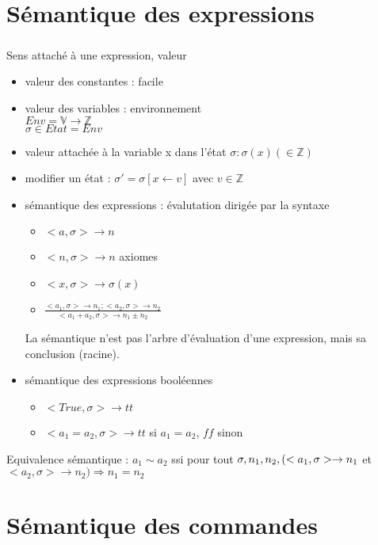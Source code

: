 \documentclass[10pt,a4paper]{article}
\begin{document}
\section{Sémantique des expressions}
\subparagraph*{} Sens attaché à une expression, valeur
\begin{itemize}
\item valeur des constantes : facile
\item valeur des variables : environnement \\
	$Env = \mathbb{V}\longrightarrow\mathbb{Z}$\\
	$ \sigma \in Etat = Env$ 
\item valeur attachée à la variable x dans l'état $\sigma : \sigma(x) \left( \in \mathbb{Z} \right)$
\item modifier un état : $\sigma ' = \sigma[x \leftarrow v]$ avec $v \in \mathbb{Z}$
\item sémantique des expressions : évalutation dirigée par la syntaxe
	\begin{itemize}
		\item $ <a, \sigma > \rightarrow n$ 
		\item $ <n, \sigma > \rightarrow n$						axiomes
		\item $ <x, \sigma > \rightarrow \sigma(x)$
		\item $\displaystyle \frac{ <a_1, \sigma > \rightarrow n_1 ; <a_2, \sigma > \rightarrow n_2}{<a_1 + a_2, \sigma > \rightarrow n_1 \pm n_2}$
	\end{itemize}
\noindent La sémantique n'est pas l'arbre d'évaluation d'une expression, mais sa conclusion (racine).
	\item sémantique des expressions booléennes
		\begin{itemize}
			\item $<True, \sigma > \rightarrow tt$
			\item $<a_1 = a_2,  \sigma > \rightarrow tt$ si $a_1 = a_2$, $ff$ sinon
		\end{itemize}
\end{itemize}
\begin{definition}{Equivalence sémantique :}
$a_1 \sim a_2$ ssi pour tout $\sigma, n_1, n_2,\\ (<a_1, \sigma> \rightarrow n_1$ et $<a_2, \sigma> \rightarrow n_2 ) \Rightarrow n_1 = n_2$\\
\end{definition}
\section{Sémantique des commandes}
\end{document}
